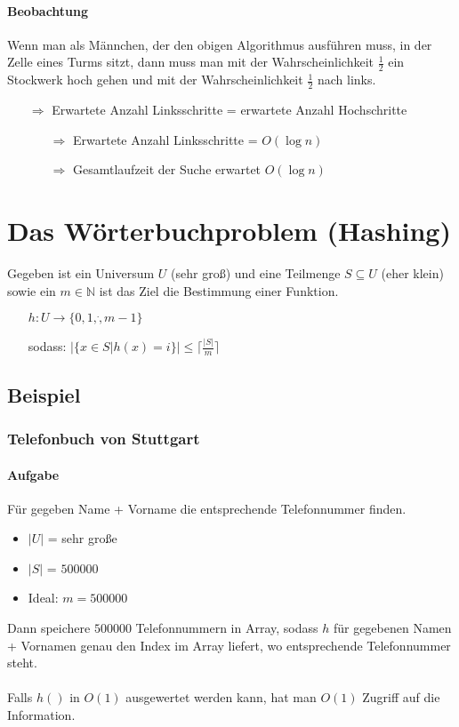 \paragraph*{Beobachtung} Wenn man als Männchen, der den obigen Algorithmus ausführen muss, in der Zelle eines Turms sitzt, dann muss man mit der Wahrscheinlichkeit $\frac{1}{2}$ ein Stockwerk hoch gehen und mit der Wahrscheinlichkeit $\frac{1}{2}$ nach links.
\begin{itemize}
	\item[$\Rightarrow$] Erwartete Anzahl Linksschritte = erwartete Anzahl Hochschritte
	\begin{itemize}
		\item[$\Rightarrow$] Erwartete Anzahl Linksschritte = $O(\log n)$
		\item[$\Rightarrow$] Gesamtlaufzeit der Suche erwartet $O(\log n)$
	\end{itemize}
\end{itemize}

\section{Das Wörterbuchproblem (Hashing)}
Gegeben ist ein Universum $U$ (sehr groß) und eine Teilmenge $S \subseteq U$ (eher klein) sowie ein $m \in \mathbb{N}$ ist das Ziel die Bestimmung einer Funktion.
\begin{itemize}
	\item[] $h : U \rightarrow \{ 0,1,\dot,m-1 \}$
	\item[]sodass: $\big| \{ x \in S | h(x) =i \} \big| \leq \lceil\frac{|S|}{m}\rceil $
\end{itemize}

\subsection{Beispiel}
\subsubsection*{Telefonbuch von Stuttgart}
\paragraph*{Aufgabe} Für gegeben Name + Vorname die entsprechende Telefonnummer finden.
\begin{itemize}
	\item $|U|$ = sehr große
	\item $|S|$ = $500 000$
	\item Ideal: $m = 500 000$
\end{itemize}
Dann speichere $500 000$ Telefonnummern in Array, sodass $h$ für gegebenen Namen + Vornamen genau den Index im Array liefert, wo entsprechende Telefonnummer steht.

\paragraph*{} Falls $h()$ in $O(1)$ ausgewertet werden kann, hat man $O(1)$ Zugriff auf die Information.